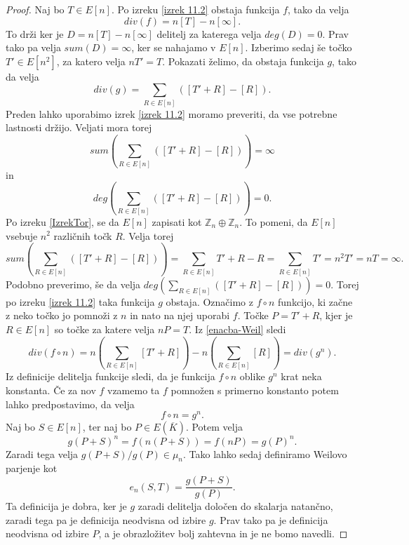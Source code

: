\documentclass[12pt,a4paper,twoside]{article}
\theoremstyle{definition} %
\theoremstyle{plain} %
\numberwithin{equation}{section}  %
\newcommand{\E}[1]{E({#1})}
\begin{document}
\begin{proof}
Naj bo $T \in E[n]$.
Po izreku \ref{izrek 11.2} obstaja funkcija $f$, tako da velja
\begin{equation}
\label{enacba-Weil}
div(f) = n[T]-n[\infty].
\end{equation}
To drži ker je $D = n[T]-n[\infty]$ delitelj za katerega velja $deg(D) = 0$. Prav tako pa velja $sum(D) = \infty$, ker se nahajamo v $E[n]$.
Izberimo sedaj še točko $T' \in E[n^2]$, za katero velja $nT' = T$. Pokazati želimo, da obstaja funkcija $g$, tako da velja
$$div(g) = \sum_{R \in E[n]}([T' + R]- [R]).$$
Preden lahko uporabimo izrek \ref{izrek 11.2} moramo preveriti, da vse potrebne lastnosti držijo. Veljati mora torej $$sum( \sum_{R \in E[n]}([T' + R]- [R])) = \infty$$ in $$deg( \sum_{R \in E[n]}([T' + R]- [R])) = 0.$$
Po izreku \ref{IzrekTor}, se da $E[n]$ zapisati kot $\mathbb{Z}_n \oplus \mathbb{Z}_n$. To pomeni, da $E[n]$ vsebuje $n^2$ različnih točk $R$. Velja torej
$$sum(\sum_{R \in E[n]}([T' + R]- [R])) = \sum_{R \in E[n]} T' +R-R = \sum_{R \in E[n]} T' = n^2T' = nT = \infty.$$
Podobno preverimo, še da velja $deg(\sum_{R \in E[n]}([T' + R]- [R])) = 0.$ Torej po izreku \ref{izrek 11.2} taka funkcija $g$ obstaja.
Označimo z $f \circ n$ funkcijo, ki začne z neko točko jo pomnoži z $n$ in nato na njej uporabi $f$. Točke $P = T' + R$, kjer je $R\in E[n]$ so točke za katere velja $nP=T$. Iz \ref{enacba-Weil}
sledi
$$div(f \circ n) = n(\sum_{R \in E[n]}[T' + R]) - n(\sum_{R \in E[n]}[R]) = div(g^n).$$
Iz definicije delitelja funkcije sledi, da je funkcija $f \circ n$ oblike $g^n$ krat neka konstanta. Če za nov $f$ vzamemo ta $f$ pomnožen s primerno konstanto potem lahko predpostavimo, da velja
$$f \circ n = g^n.$$
Naj bo $S \in E[n]$, ter naj bo $P \in \E{\overline{K}}$. Potem velja
$$g(P+S)^n = f(n(P+S)) = f(nP) = g(P)^n.$$
Zaradi tega velja $g(P+S)/g(P) \in \mu_n$.
Tako lahko sedaj definiramo Weilovo parjenje kot
$$e_n(S,T) = \frac{g(P+S)}{g(P)}.$$
Ta definicija je dobra, ker je $g$ zaradi delitelja določen do skalarja natančno, zaradi tega pa je definicija neodvisna od izbire $g$. Prav tako pa je definicija neodvisna od izbire $P$, a je obrazložitev bolj zahtevna in je ne bomo navedli.


\end{proof}
\end{document}
